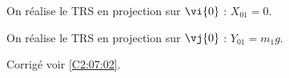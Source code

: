 \ifprof

On réalise le TRS en projection sur $\vi{0}$ : $X_{01}=0$.

On réalise le TRS en projection sur $\vj{0}$ : $Y_{01}=m_1g$.
\else
\fi

\ifprof
\else
\begin{flushright}
\footnotesize{Corrigé  voir \ref{C2:07:02}.}
\end{flushright}%
\fi